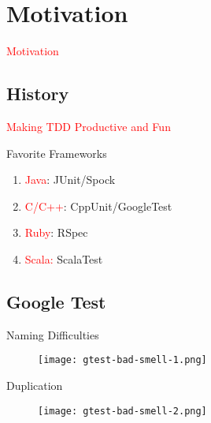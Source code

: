\section{Motivation}
\label{sec:motivation}

\begin{frame}
  \begin{center}
    \Huge{\textcolor{red}{Motivation}}
  \end{center}
\end{frame}

\subsection{History}

\begin{frame}
  \begin{center}
    \huge{\textcolor{red}{Making TDD Productive and Fun}}
  \end{center}
\end{frame}

\begin{frame}{Favorite Frameworks} 
  \begin{enumerate}
    \item \textcolor{red}{Java}: JUnit/Spock
    \item \textcolor{red}{C/C++}: CppUnit/GoogleTest
    \item \textcolor{red}{Ruby}: RSpec
    \item \textcolor{red}{Scala:} ScalaTest
  \end{enumerate}
\end{frame}

\subsection{Google Test}

\begin{frame}{Naming Difficulties}
    \centering
    \begin{figure}
      \centering
      \texttt{[image: gtest-bad-smell-1.png]}
    \end{figure}
\end{frame}

\begin{frame}{Duplication}
    \centering
    \begin{figure}
      \centering
      \texttt{[image: gtest-bad-smell-2.png]}
    \end{figure}
\end{frame}

